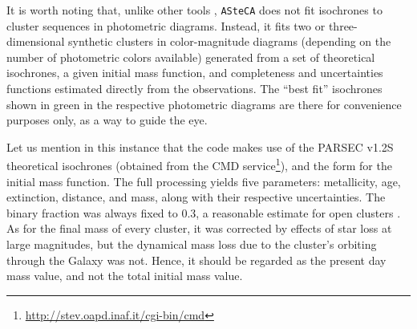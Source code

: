 \documentclass[draft]{aa}
\begin{document}
It is worth noting that, unlike other tools \citep[e.g.:][]{Yen_2018},
\texttt{ASteCA} does not fit isochrones to cluster sequences in photometric
diagrams. Instead, it fits two or three-dimensional synthetic
clusters in color-magnitude diagrams (depending on the number of photometric
colors available) generated from a set of theoretical isochrones, a given
initial mass function, and completeness and uncertainties functions estimated
directly from the observations. The ``best fit'' isochrones shown in green in
the respective photometric diagrams are there for convenience purposes only, as
a way to guide the eye.

Let us mention in this instance that the code makes use
of the PARSEC v1.2S \citep{Bressan_2012} theoretical isochrones (obtained from
the CMD service\footnote{\url{http://stev.oapd.inaf.it/cgi-bin/cmd}}), and the
\cite{Kroupa_2002} form for the initial mass function. The full processing
yields five parameters: metallicity, age, extinction,
distance, and mass, along with their respective uncertainties. The binary
fraction was always fixed to 0.3, a reasonable
estimate for open clusters \citep{Sollima_2010}. As for the final mass of every
cluster, it was corrected by effects of star loss at large magnitudes, but the
dynamical mass loss due to the cluster's orbiting through the Galaxy was not.
Hence, it should be regarded as the present day mass value, and not the total
initial mass value. 
\end{document}
